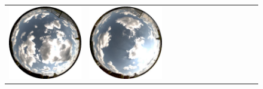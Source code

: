 \begin{figure}
\begin{tabular}{@{}rcccccccccccc@{}}
    \includegraphics[width=\customwidth]{./figures/database/20130824_145957.jpg} &
    \includegraphics[width=\customwidth]{./figures/database/20130824_152946.jpg} &

\end{tabular}
\end{figure}
